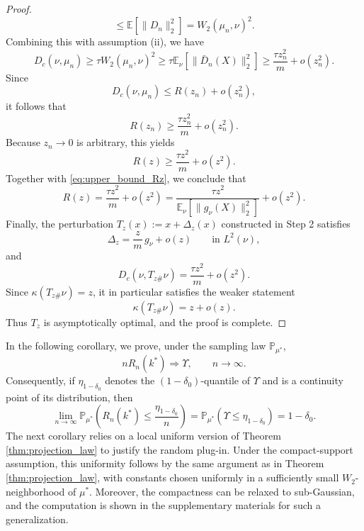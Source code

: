 \documentclass[11pt]{article}
\theoremstyle{definition}
\newcommand{\E}{\mathbb{E}}
\begin{document}
\begin{proof}
{\[\le
\E[\|D_n\|_2^2]
=
W_2(\mu_n,\nu)^2.
\]
Combining this with assumption (ii), we have 
\[
D_c(\nu,\mu_n)
\ge
\tau W_2(\mu_n,\nu)^2
\ge
\tau \E_\nu[\|\bar D_n(X)\|_2^2]
\ge
\frac{\tau z_n^2}{m}+o(z_n^2).
\]
Since
\[
D_c(\nu,\mu_n)\le R(z_n)+o(z_n^2),
\]
it follows that
\[
R(z_n)\ge \frac{\tau z_n^2}{m}+o(z_n^2).
\]
Because \(z_n\to0\) is arbitrary, this yields
\[
R(z)\ge \frac{\tau z^2}{m}+o(z^2).
\]
Together with \eqref{eq:upper_bound_Rz}, we conclude that
\[
R(z)=\frac{\tau z^2}{m}+o(z^2)
=
\frac{\tau z^2}{\E_\nu[\|g_\nu(X)\|_2^2]}+o(z^2).
\]
Finally, the perturbation \(T_z(x):=x+\Delta_z(x)\) constructed in Step 2 satisfies
\[
\Delta_z
=
\frac{z}{m}\,g_\nu+o(z)
\qquad\text{in }L^2(\nu),
\]
and
\[
D_c(\nu,T_{z\#}\nu)
=
\frac{\tau z^2}{m}+o(z^2).
\]
Since \(\kappa(T_{z\#}\nu)=z\), it in particular satisfies the weaker statement
\[
\kappa(T_{z\#}\nu)=z+o(z).
\]
Thus \(T_z\) is asymptotically optimal, and the proof is complete.}
\end{proof}


    

    


  


    


{
In the following corollary, we prove, under the sampling law \(\mathbb P_{\mu^*}\),
\[
nR_n(k^*)\Rightarrow \Upsilon,\qquad n\to\infty.
\]
Consequently, if \(\eta_{1-\delta_0}\) denotes the \((1-\delta_0)\)-quantile of \(\Upsilon\)
and is a continuity point of its distribution, then
\[
\lim_{n\to\infty}
\mathbb P_{\mu^*}
\left(
R_n(k^*)\le \frac{\eta_{1-\delta_0}}{n}
\right)
=
\mathbb P_{\mu^*}(\Upsilon\le \eta_{1-\delta_0})
=
1-\delta_0.
\]
}
{
{The next corollary relies on a local uniform version of Theorem \ref{thm:projection_law} to justify the random
plug-in. Under the compact-support assumption, this uniformity follows by the same argument
as in Theorem \ref{thm:projection_law}, with constants chosen uniformly in a sufficiently small \(W_2\)-neighborhood
of \(\mu^*\).} 
Moreover, the compactness can be relaxed to sub-Gaussian, and the computation is shown in the supplementary materials for such a generalization.}
\end{document}
